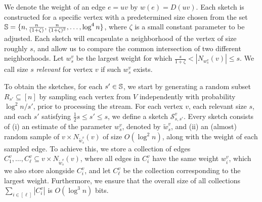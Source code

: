 \documentclass{article}
\newcommand{\Sk}{{\mathcal{S}}}
\begin{document}
We denote the weight of an edge $e=uv$ by $w(e)=D(uv)$.
Each sketch is constructed for a specific vertex with a predetermined size chosen from the set $\mathbb{S} = \{n, \frac{n}{(1+\zeta)}, \frac{n}{(1+\zeta)^2}, \dots, \log^4 n\}$, where $\zeta$ is a small constant parameter to be adjusted.
Each sketch will encapsulate a neighborhood of the vertex of size roughly $s$, and allow us to compare the common intersection of two different neighborhoods. 
Let \(w^v_s\) be the largest weight for which \(\frac{s}{1+\zeta}<|N_{w^v_s}(v)| \le s\). We call size \(s\) \emph{relevant} for vertex $v$ if such \(w^v_s\) exists.

To obtain the sketches, for each $s' \in \mathbb{S}$, we start by generating a random subset \(R_{s'} \subseteq [n]\) by sampling each vertex from $V$ independently with probability $\log^2 n/s'$, prior to processing the stream. 
For each vertex $v$, each relevant size $s$, and each $s'$ satisfying $\frac{1}{2}s \leq s' \leq s$, we define a sketch \(\Sk^{v}_{s,s'}\). 
Every sketch consists of (i) an estimate of the parameter \(w^v_s\), denoted by \(\tilde{w}^v_s\), and (ii) an (almost) random sample of \(v\times N_{\tilde{w}^v_s}(v) \) of size \(O(\log^2 n)\), along with the weight of each sampled edge. To achieve this, we store a collection of edges \(C_1^v, \dots, C_\ell^v \subseteq v\times N_{\tilde{w}^v_s}(v)\), where all edges in \(C_i^v\) have the same weight $w^v_i$, which we also store alongside \(C_i^v\), and let $C_\ell^v$ be the collection corresponding to the largest weight. Furthermore, we ensure that the overall size of all collections \(\sum_{i \in [\ell]} |C_i^v|\) is  \(O(\log^3 n)\) bits.
\end{document}
